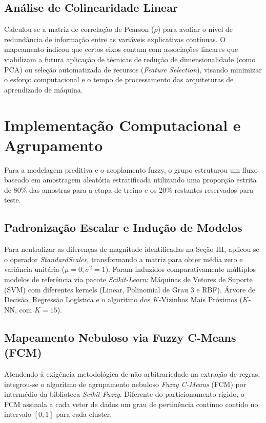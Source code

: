 \documentclass[journal]{IEEEtran}
\begin{document}
\subsection{Análise de Colinearidade Linear}
Calculou-se a matriz de correlação de Pearson ($\rho$) para avaliar o nível de redundância de informação entre as variáveis explicativas contínuas. O mapeamento indicou que certos eixos contam com associações lineares que viabilizam a futura aplicação de técnicas de redução de dimensionalidade (como PCA) ou seleção automatizada de recursos (\textit{Feature Selection}), visando minimizar o esforço computacional e o tempo de processamento das arquiteturas de aprendizado de máquina.

\section{Implementação Computacional e Agrupamento}
Para a modelagem preditiva e o acoplamento fuzzy, o grupo estruturou um fluxo baseado em amostragem aleatória estratificada utilizando uma proporção estrita de 80\% das amostras para a etapa de treino e os 20\% restantes reservados para teste.

\subsection{Padronização Escalar e Indução de Modelos}
Para neutralizar as diferenças de magnitude identificadas na Seção III, aplicou-se o operador \textit{StandardScaler}, transformando a matriz para obter média zero e variância unitária ($\mu=0, \sigma^2=1$). Foram induzidos comparativamente múltiplos modelos de referência via pacote \textit{Scikit-Learn}: Máquinas de Vetores de Suporte (SVM) com diferentes kernels (Linear, Polinomial de Grau 3 e RBF), Árvore de Decisão, Regressão Logística e o algoritmo dos $K$-Vizinhos Mais Próximos ($K$-NN, com $K=15$).

\subsection{Mapeamento Nebuloso via Fuzzy C-Means (FCM)}
Atendendo à exigência metodológica de não-arbitrariedade na extração de regras, integrou-se o algoritmo de agrupamento nebuloso \textit{Fuzzy C-Means} (FCM) por intermédio da biblioteca \textit{Scikit-Fuzzy}. Diferente do particionamento rígido, o FCM assinala a cada vetor de dados um grau de pertinência contínuo contido no intervalo $[0, 1]$ para cada cluster. 
\end{document}
